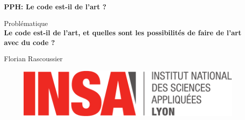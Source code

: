 \begin{titlepage}
    \begin{center}
        \vspace{2cm}

        \Large
        \textbf{PPH: Le code est-il de l'art ?}

        \vspace{2cm}
        \Large
        Problématique\\
        \textbf{Le code est-il de l'art, et quelles sont les possibilités de faire de l'art avec du code ?}
            
        \vspace{2cm}
        \normalsize
        Florian Rascoussier

        \vfill

        \begin{figure}[h]
            \centering
            \includegraphics[scale=0.7]{insa.pdf}
        \end{figure}
        
    \end{center}
\end{titlepage}